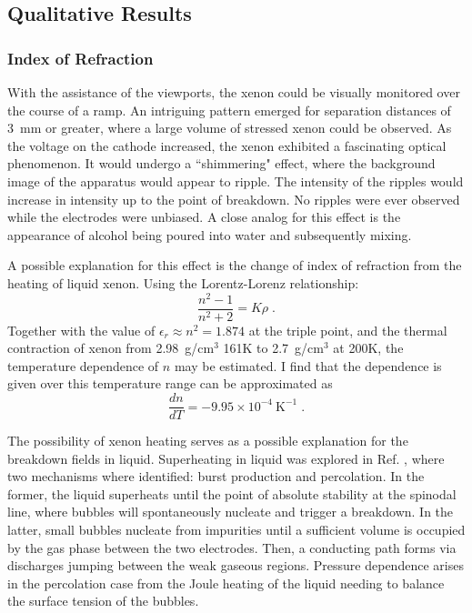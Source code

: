 \subsection{Qualitative Results}
\subsubsection{Index of Refraction}
With the assistance of the viewports, the xenon could be visually monitored over the course of a ramp.
An intriguing pattern emerged for separation distances of 3~mm or greater, where a large volume of stressed xenon could be observed.
As the voltage on the cathode increased, the xenon exhibited a fascinating optical phenomenon.
It would undergo a ``shimmering" effect, where the background image of the apparatus would appear to ripple.
The intensity of the ripples would increase in intensity up to the point of breakdown.
No ripples were ever observed while the electrodes were unbiased.
A close analog for this effect is the appearance of alcohol being poured into water and subsequently mixing.

A possible explanation for this effect is the change of index of refraction from the heating of liquid xenon.
Using the Lorentz-Lorenz relationship: 
\begin{equation}
    \frac{n^2-1}{n^2+2} = K \rho\;.
\end{equation}
\noindent
Together with the value of $\epsilon_r \approx n^2 = 1.874$ at the triple point\cite{amey_dielectric_1964}, and the thermal contraction of xenon from 2.98~g/cm$^{3}$ 161K to 2.7~g/cm$^{3}$ at 200K\cite{terry_densities_1969}, the temperature dependence of $n$ may be estimated.
I find that the dependence is given over this temperature range can be approximated as
\begin{equation}
    \frac{dn}{dT} = -9.95 \times 10^{-4}~ \text{K}^{-1}\;.
\end{equation}

The possibility of xenon heating serves as a possible explanation for the breakdown fields in liquid.
Superheating in liquid was explored in Ref. \cite{atrazhev_mechanisms_2010}, where two mechanisms where identified: burst production and percolation.
In the former, the liquid superheats until the point of absolute stability at the spinodal line, where bubbles will spontaneously nucleate and trigger a breakdown.
In the latter, small bubbles nucleate from impurities until a sufficient volume is occupied by the gas phase between the two electrodes.
Then, a conducting path forms via discharges jumping between the weak gaseous regions.
Pressure dependence arises in the percolation case from the Joule heating of the liquid needing to balance the surface tension of the bubbles.

